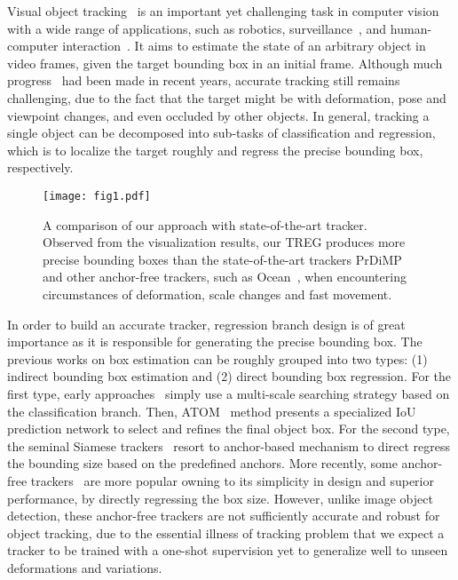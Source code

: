 \documentclass[10pt,twocolumn,letterpaper]{article}
\begin{document}
Visual object tracking~\cite{siamfc,siamrpn,atom,dimp} is an important yet challenging task in computer vision with a wide range of applications, such as robotics, surveillance~\cite{introduction2}, and human-computer interaction~\cite{introduction1}. It aims to estimate the state of an arbitrary object in video frames, given the target bounding box in an initial frame. Although much progress~\cite{siamfc,siamrpn,atom,dimp} had been made in recent years, accurate tracking still remains challenging, due to the fact that the target might be with deformation, pose and viewpoint changes, and even occluded by other objects. In general, tracking a single object can be decomposed into sub-tasks of classification and regression, which is to localize the target roughly and regress the precise bounding box, respectively. 


\begin{figure}[t]
\centering
\texttt{[image: fig1.pdf]}
\caption{A comparison of our approach with state-of-the-art tracker. Observed from the visualization results, our TREG produces more precise bounding boxes than the state-of-the-art trackers PrDiMP~\cite{prdimp} and other anchor-free trackers, such as Ocean~\cite{ocean}, when encountering circumstances of deformation, scale changes and fast movement.
}
\label{fig:1}
\end{figure}

In order to build an accurate tracker, regression branch design is of great importance as it is responsible for generating the precise bounding box. The previous works on box estimation can be roughly grouped into two types: (1) indirect bounding box estimation and (2) direct bounding box regression. For the first type, early approaches~\cite{siamfc} simply use a multi-scale searching strategy based on the classification branch. Then, ATOM~\cite{atom} method presents a specialized IoU prediction network to select and refines the final object box. For the second type, the seminal Siamese trackers~\cite{siamrpn,dasiamrpn,siamrpnPlus} resort to anchor-based mechanism to direct regress the bounding size based on the predefined anchors. More recently, some anchor-free trackers~\cite{ocean,siamfc++,siamban,siamcar} are more popular owning to its simplicity in design and superior performance, by directly regressing the box size. However, unlike image object detection, these anchor-free trackers are not sufficiently accurate and robust for object tracking, due to the essential illness of tracking problem that we expect a tracker to be trained with a one-shot supervision yet to generalize well to unseen deformations and variations.
\end{document}
